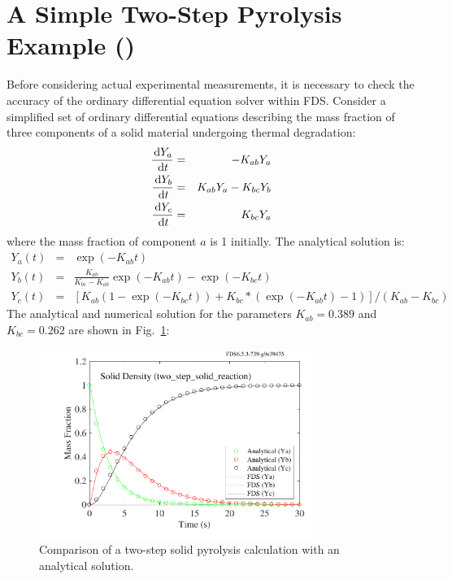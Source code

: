 \documentclass[11pt]{book}
\begin{document}
\clearpage


\section{A Simple Two-Step Pyrolysis Example (\texorpdfstring{}{two\_step\_solid\_reaction})}

Before considering actual experimental measurements, it is necessary to check the accuracy of the ordinary differential
equation solver within FDS. Consider a simplified set  of ordinary  differential equations  describing the mass
fraction of three components of a solid material  undergoing thermal degradation:
\begin{eqnarray}
    \frac{\,\mathrm{d} Y_a}{\,\mathrm{d} t} &=&  -K_{ab} Y_a \nonumber  \\
    \frac{\,\mathrm{d} Y_b}{\,\mathrm{d} t} &=&   K_{ab} Y_a  -  K_{bc}  Y_b  \\
    \frac{\,\mathrm{d} Y_c}{\,\mathrm{d} t} &=&   K_{bc} Y_a
    \nonumber
\end{eqnarray}
where  the  mass  fraction  of  component  $a$  is  1  initially.  The
analytical solution is:
\begin{eqnarray}
    Y_a(t)    &=&    \exp(-K_{ab}t)    \nonumber   \\
    Y_b(t)    &=&    \frac{K_{ab}}{K_{bc}-K_{ab}} \exp(-K_{ab} t)  - \exp(-K_{bc} t) \\
    Y_c(t)    &=&    \left[   K_{ab}    (1-\exp(-K_{bc} t) )    +  K_{bc}*(\exp(-K_{ab} t) -1) \right] / (K_{ab}-K_{bc})
\end{eqnarray}
The analytical and  numerical solution for the parameters $K_{ab} = 0.389$ and $K_{bc} = 0.262$ are shown in Fig.~\ref{fig:two_step_solid_reaction}:

\begin{figure}[ht]
\begin{center}
\includegraphics[width=3.5in]{SCRIPT_FIGURES/two_step_solid_reaction}
\end{center}
\caption[The  test case]{Comparison of a two-step solid pyrolysis calculation with an analytical solution.}
\label{fig:two_step_solid_reaction}
\end{figure}
\end{document}
